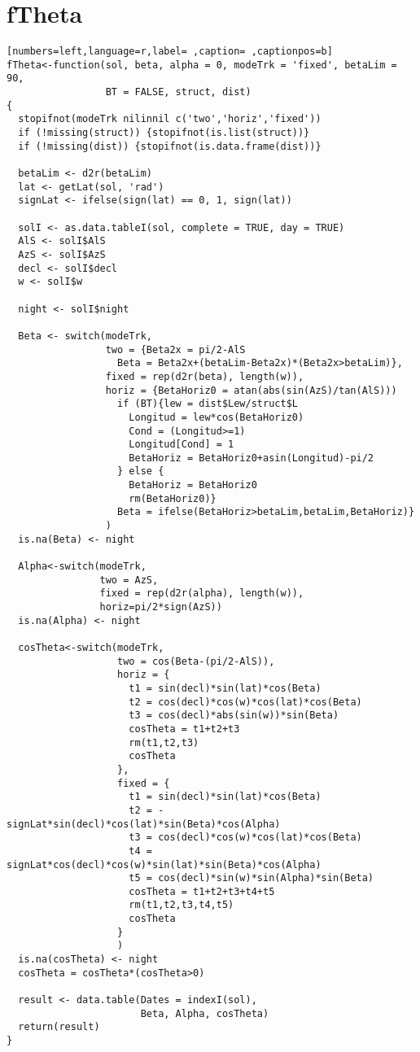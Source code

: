 \section{fTheta}
\label{sec:org89b1891}
\begin{lstlisting}[numbers=left,language=r,label= ,caption= ,captionpos=b]
fTheta<-function(sol, beta, alpha = 0, modeTrk = 'fixed', betaLim = 90, 
                 BT = FALSE, struct, dist)
{
  stopifnot(modeTrk nilinnil c('two','horiz','fixed'))
  if (!missing(struct)) {stopifnot(is.list(struct))}
  if (!missing(dist)) {stopifnot(is.data.frame(dist))}

  betaLim <- d2r(betaLim)
  lat <- getLat(sol, 'rad')
  signLat <- ifelse(sign(lat) == 0, 1, sign(lat)) 

  solI <- as.data.tableI(sol, complete = TRUE, day = TRUE)
  AlS <- solI$AlS
  AzS <- solI$AzS
  decl <- solI$decl
  w <- solI$w

  night <- solI$night

  Beta <- switch(modeTrk,
                 two = {Beta2x = pi/2-AlS	
                   Beta = Beta2x+(betaLim-Beta2x)*(Beta2x>betaLim)},
                 fixed = rep(d2r(beta), length(w)), 
                 horiz = {BetaHoriz0 = atan(abs(sin(AzS)/tan(AlS)))
                   if (BT){lew = dist$Lew/struct$L
                     Longitud = lew*cos(BetaHoriz0)
                     Cond = (Longitud>=1)
                     Longitud[Cond] = 1
                     BetaHoriz = BetaHoriz0+asin(Longitud)-pi/2                                     
                   } else {
                     BetaHoriz = BetaHoriz0
                     rm(BetaHoriz0)}
                   Beta = ifelse(BetaHoriz>betaLim,betaLim,BetaHoriz)}
                 )
  is.na(Beta) <- night

  Alpha<-switch(modeTrk,
                two = AzS,
                fixed = rep(d2r(alpha), length(w)),
                horiz=pi/2*sign(AzS))
  is.na(Alpha) <- night

  cosTheta<-switch(modeTrk,
                   two = cos(Beta-(pi/2-AlS)),
                   horiz = {
                     t1 = sin(decl)*sin(lat)*cos(Beta)      
                     t2 = cos(decl)*cos(w)*cos(lat)*cos(Beta)   
                     t3 = cos(decl)*abs(sin(w))*sin(Beta)   
                     cosTheta = t1+t2+t3
                     rm(t1,t2,t3)
                     cosTheta
                   },
                   fixed = {
                     t1 = sin(decl)*sin(lat)*cos(Beta)      
                     t2 = -signLat*sin(decl)*cos(lat)*sin(Beta)*cos(Alpha) 
                     t3 = cos(decl)*cos(w)*cos(lat)*cos(Beta)   
                     t4 = signLat*cos(decl)*cos(w)*sin(lat)*sin(Beta)*cos(Alpha) 
                     t5 = cos(decl)*sin(w)*sin(Alpha)*sin(Beta)   
                     cosTheta = t1+t2+t3+t4+t5
                     rm(t1,t2,t3,t4,t5)
                     cosTheta
                   }
                   )
  is.na(cosTheta) <- night
  cosTheta = cosTheta*(cosTheta>0) 

  result <- data.table(Dates = indexI(sol),
                       Beta, Alpha, cosTheta)
  return(result)
}
\end{lstlisting}
